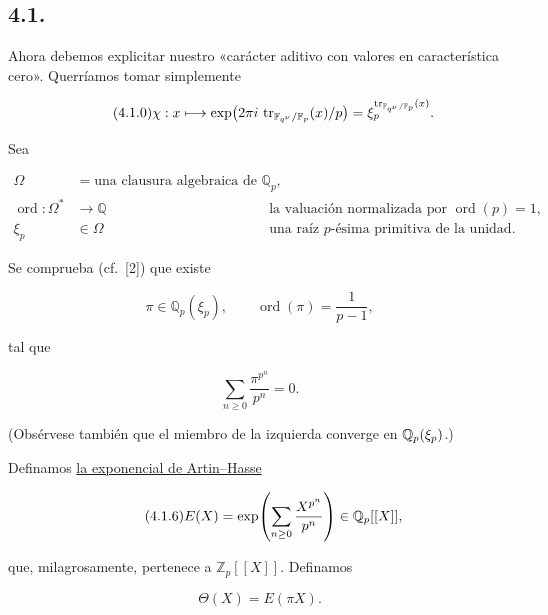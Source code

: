 \subsection*{4.1.}
Ahora debemos explicitar nuestro «carácter aditivo con valores en
característica cero». Querríamos tomar simplemente

\begin{equation}\tag{4.1.0}
\chi:x\longmapsto
\exp\!\left(2\pi i\,\operatorname{tr}_{\mathbb F_{q^\nu}/\mathbb F_p}(x)\sisi{\right.}{/p\right)}
=\xi_p^{\operatorname{tr}_{\mathbb F_{q^\nu}/\sisi{\mathbb H_p}{\mathbb F_p}}(x)}.
\end{equation}

\pageoriginale

Sea

{\footnotesize\begin{align}
\tag{4.1.1}
\Omega&=\text{una clausura algebraica de }\mathbb Q_p,\\
\tag{4.1.2}
\operatorname{ord}:\Omega^*&\longrightarrow\mathbb Q
  &&\text{la valuación normalizada por }\operatorname{ord}(p)=1,\\
\tag{4.1.3}
\xi_p&\in\Omega
  &&\text{una raíz $p$-ésima primitiva de la unidad.}
\end{align}}

Se comprueba (cf.~[2]) que existe

\begin{equation}\tag{4.1.4}
\pi\in\mathbb Q_p(\xi_p),\qquad
\operatorname{ord}(\pi)=\frac1{p-1},
\end{equation}

tal que

\begin{equation}\tag{4.1.5}
\sum_{n\geq0}\frac{\pi^{p^n}}{p^n}=0.
\end{equation}

(Obsérvese también que el miembro de la izquierda converge en
$\sisi{Q}{\mathbb Q}_p(\xi_p)$.)

Definamos \underline{la exponencial de Artin--Hasse}

\begin{equation}\tag{4.1.6}
E(X)=\exp\!\left(\sum_{n\geq0}\frac{X^{p^n}}{p^n}\right)
\in\sisi{Q}{\mathbb Q}_p[[X]],
\end{equation}

que, milagrosamente, pertenece a $\mathbb Z_p[[X]]$. Definamos

\begin{equation}\tag{4.1.7}
\Theta(X)=E(\pi X).
\end{equation}

